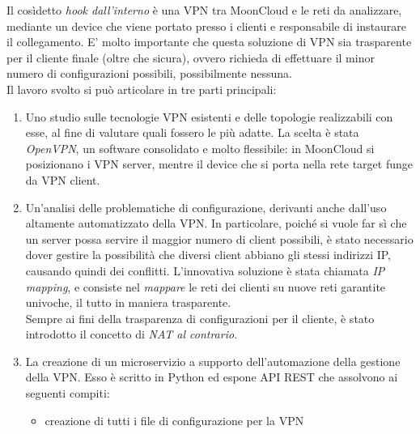 \documentclass[10pt,a4paper]{article}
\begin{document}
        Il cosìdetto \textit{hook dall'interno} è una VPN tra
        MoonCloud e le reti da analizzare, mediante un device che viene portato presso i clienti
        e responsabile di instaurare il collegamento. E' molto importante che questa soluzione
        di VPN
        sia trasparente per il cliente finale (oltre che sicura), ovvero richieda di
        effettuare il minor numero di configurazioni possibili, possibilmente nessuna.\\
        Il lavoro svolto si può articolare in tre parti principali:
        \begin{enumerate}
            \item Uno studio sulle tecnologie VPN esistenti e delle topologie realizzabili
            con esse, al fine di valutare quali
            fossero le più adatte. La scelta è stata \textit{OpenVPN},
            un software consolidato e molto flessibile: in MoonCloud si posizionano
            i VPN server, mentre il device che si porta nella rete target funge da
            VPN client.
            \item Un'analisi delle problematiche di configurazione, derivanti anche
            dall'uso
            altamente automatizzato della VPN.
            In particolare,
            poiché si vuole far sì che un server possa servire il maggior numero
            di client possibili, è stato necessario dover gestire la possibilità
            che diversi client abbiano gli stessi indirizzi IP, causando quindi
            dei conflitti. L'innovativa soluzione è stata chiamata \textit{IP
            mapping}, e consiste nel \textit{mappare} le reti dei clienti su nuove
            reti garantite univoche, il tutto in maniera trasparente.\\
            Sempre ai fini della trasparenza di configurazioni per il cliente,
            è stato introdotto il concetto di \textit{NAT al contrario}.
            \item La creazione di un microservizio a supporto dell'automazione
            della gestione della VPN. Esso è scritto in Python ed espone API REST che
            assolvono ai seguenti compiti:
            \begin{itemize}
                \item creazione di tutti i file di configurazione per la VPN

\end{itemize}
\end{enumerate}
\end{document}
